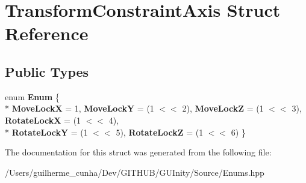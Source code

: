 \hypertarget{struct_transform_constraint_axis}{}\section{Transform\+Constraint\+Axis Struct Reference}
\label{struct_transform_constraint_axis}
\subsection*{Public Types}
\begin{DoxyCompactItemize}
\item 
\hypertarget{struct_transform_constraint_axis_afdade6ebb632b10b7546e97c73a729f6}{}enum {\bfseries Enum} \{ \\*
{\bfseries Move\+Lock\+X} = 1, 
{\bfseries Move\+Lock\+Y} = (1 $<$$<$ 2), 
{\bfseries Move\+Lock\+Z} = (1 $<$$<$ 3), 
{\bfseries Rotate\+Lock\+X} = (1 $<$$<$ 4), 
\\*
{\bfseries Rotate\+Lock\+Y} = (1 $<$$<$ 5), 
{\bfseries Rotate\+Lock\+Z} = (1 $<$$<$ 6)
 \}\label{struct_transform_constraint_axis_afdade6ebb632b10b7546e97c73a729f6}

\end{DoxyCompactItemize}


The documentation for this struct was generated from the following file\+:\begin{DoxyCompactItemize}
\item 
/\+Users/guilherme\+\_\+cunha/\+Dev/\+G\+I\+T\+H\+U\+B/\+G\+U\+Inity/\+Source/Enums.\+hpp\end{DoxyCompactItemize}
